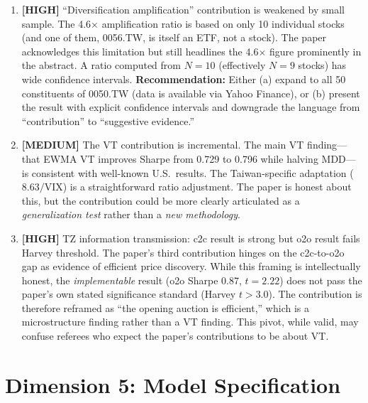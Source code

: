 \documentclass[12pt,a4paper]{article}
\newcommand{\HIGH}[1]{\textcolor{errorred}{\textbf{[HIGH]} #1}}
\newcommand{\MEDIUM}[1]{\textcolor{warncolor}{\textbf{[MEDIUM]} #1}}
\begin{document}
\begin{enumerate}[leftmargin=2em]

\item \HIGH{``Diversification amplification'' contribution is weakened by small sample.} The 4.6$\times$ amplification ratio is based on only 10 individual stocks (and one of them, 0056.TW, is itself an ETF, not a stock). The paper acknowledges this limitation but still headlines the 4.6$\times$ figure prominently in the abstract. A ratio computed from $N=10$ (effectively $N=9$ stocks) has wide confidence intervals. \textbf{Recommendation:} Either (a) expand to all 50 constituents of 0050.TW (data is available via Yahoo Finance), or (b) present the result with explicit confidence intervals and downgrade the language from ``contribution'' to ``suggestive evidence.''

\item \MEDIUM{The VT contribution is incremental.} The main VT finding---that EWMA VT improves Sharpe from 0.729 to 0.796 while halving MDD---is consistent with well-known U.S.\ results. The Taiwan-specific adaptation ($8.63/\text{VIX}$) is a straightforward ratio adjustment. The paper is honest about this, but the contribution could be more clearly articulated as a \textit{generalization test} rather than a \textit{new methodology}.

\item \HIGH{TZ information transmission: c2c result is strong but o2o result fails Harvey threshold.} The paper's third contribution hinges on the c2c-to-o2o gap as evidence of efficient price discovery. While this framing is intellectually honest, the \textit{implementable} result (o2o Sharpe 0.87, $t = 2.22$) does not pass the paper's own stated significance standard (Harvey $t > 3.0$). The contribution is therefore reframed as ``the opening auction is efficient,'' which is a microstructure finding rather than a VT finding. This pivot, while valid, may confuse referees who expect the paper's contributions to be about VT.

\end{enumerate}

\section{Dimension 5: Model Specification}
\end{document}
